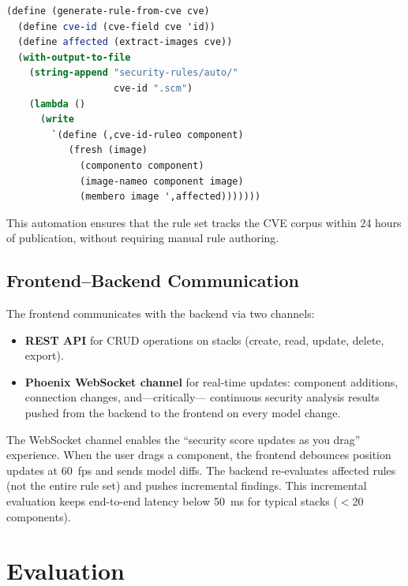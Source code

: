 \documentclass[11pt,twocolumn]{article}
\begin{document}
\begin{lstlisting}[language=Scheme,caption={Automated CVE-to-rule
generation.},label=lst:cve-sync]
(define (generate-rule-from-cve cve)
  (define cve-id (cve-field cve 'id))
  (define affected (extract-images cve))
  (with-output-to-file
    (string-append "security-rules/auto/"
                   cve-id ".scm")
    (lambda ()
      (write
        `(define (,cve-id-ruleo component)
           (fresh (image)
             (componento component)
             (image-nameo component image)
             (membero image ',affected)))))))
\end{lstlisting}

This automation ensures that the rule set tracks the CVE corpus
within 24 hours of publication, without requiring manual rule authoring.

\subsection{Frontend--Backend Communication}
\label{sec:impl-comm}

The frontend communicates with the backend via two channels:

\begin{itemize}[leftmargin=*]
\item \textbf{REST API} for CRUD operations on stacks (create, read,
      update, delete, export).
\item \textbf{Phoenix WebSocket channel} for real-time updates:
      component additions, connection changes, and---critically---
      continuous security analysis results pushed from the backend
      to the frontend on every model change.
\end{itemize}

The WebSocket channel enables the ``security score updates as you
drag'' experience. When the user drags a component, the frontend
debounces position updates at 60~fps and sends model diffs. The
backend re-evaluates affected rules (not the entire rule set) and
pushes incremental findings. This incremental evaluation keeps
end-to-end latency below 50~ms for typical stacks ($<$20 components).


\section{Evaluation}
\label{sec:eval}
\end{document}
